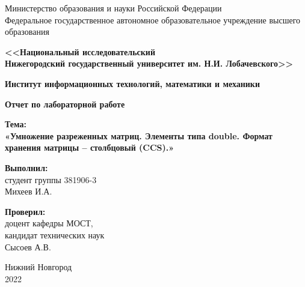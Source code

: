 \documentclass{report}
\begin{document}
\begin{titlepage}
\begin{center}
    Министерство образования и науки Российской Федерации \\
    Федеральное государственное автономное образовательное учреждение высшего образования
\end{center}
\begin{center}
    \textbf{<<Национальный исследовательский\\Нижегородский государственный университет им. Н.И. Лобачевского>>} \\
\end{center}
\begin{center}
    \textbf{Институт информационных технологий, математики и механики}\\
\end{center}

\vspace{4em}

\begin{center}
    \textbf{\Large Отчет по лабораторной работе} \\
\end{center}

\begin{center}
    \textbf{\Large Тема:} \\
    \vspace{1em}
    \textbf{\large «Умножение разреженных матриц. Элементы типа double. Формат хранения матрицы – столбцовый (CCS).»}
\end{center}

\vspace{4em}

\begin{flushright}
\begin{minipage}{0.4\textwidth}
\begin{flushleft}

\textbf{Выполнил:} \\
студент группы 381906-3 \\
Михеев И.А. \\

\vspace

\textbf{Проверил:} \\
доцент кафедры МОСТ, \\
кандидат технических наук \\
Сысоев А.В. \\
\end{flushleft}
\end{minipage}
\end{flushright}
\vspace{\fill}
\begin{center}
Нижний Новгород \\
2022
\end{center}
\end{titlepage}
\end{document}
